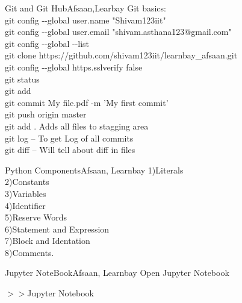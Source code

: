 \documentclass[aspectratio=169, 10pt]{beamer}
\begin{document}
\begin{frame}[t]{Git and Git Hub}{Afsaan,Learbay}
Git basics:\\  \vspace{0.25 cm}
git config -\hspace{1mm}-global user.name "Shivam123iit"\\
git config -\hspace{1mm}-global user.email "shivam.asthana123@gmail.com"\\
git config -\hspace{1mm}-global -\hspace{1mm}-list\\
git clone    https://github.com/shivam123iit/learnbay\_afsaan.git\\
git config -\hspace{1mm}-global https.sslverify false\\
git status \\
git add \\
git commit My file.pdf -m 'My first commit' \\ 
git push origin master \\
git add . Adds all files to stagging area\\
git log -- To get Log of all commits \\
git diff -- Will tell about diff in files\\
 
\end{frame}
\begin{frame}[t]{Python Components}{Afsaan, Learnbay}
1)\hspace{1 cm}Literals\\
2)\hspace{1 cm}Constants\\
3)\hspace{1 cm}Variables\\
4)\hspace{1 cm}Identifier\\
5)\hspace{1 cm}Reserve Words\\
6)\hspace{1 cm}Statement and Expression\\
7)\hspace{1 cm}Block and Identation\\
8)\hspace{1 cm}Comments. \\
\end{frame}

\begin{frame}[t]{Jupyter NoteBook}{Afsaan, Learnbay}
Open Jupyter Notebook

$>>$Jupyter Notebook 


\end{frame}
\end{document}
